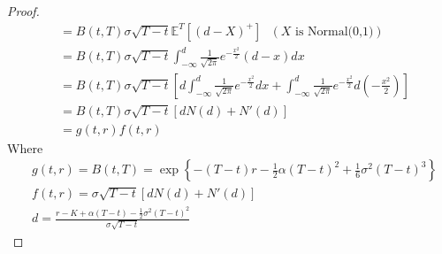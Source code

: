 \documentclass[a4paper, 10pt]{article}
\theoremstyle{definition}
\theoremstyle{hSol}
\begin{document}
\begin{proof}
\begin{equation}
\begin{split}
    &= B(t,T)\sigma \sqrt{T-t}\mathbb{E}^T\left[(d-X)^+\right]~~~(X\text{ is Normal(0,1)}) \\
    &= B(t,T)\sigma \sqrt{T-t} \int_{-\infty}^d \frac{1}{\sqrt{2\pi}}e^{-\frac{x^2}{2}}(d-x)dx \\
    &= B(t,T)\sigma \sqrt{T-t} \left[d\int_{-\infty}^d \frac{1}{\sqrt{2\pi}}e^{-\frac{x^2}{2}}dx + \int_{-\infty}^d \frac{1}{\sqrt{2\pi}}e^{-\frac{x^2}{2}} d\left(-\frac{x^2}{2}\right) \right]\\
    &= B(t,T)\sigma \sqrt{T-t} \left[dN(d) + N'(d) \right]\\
    &= g(t,r)f(t,r)
  \end{split}
\end{equation}
Where
\begin{equation}
  \begin{split}
    &g(t,r) = B(t,T) = \exp\left\{-(T-t)r - \frac{1}{2}\alpha(T-t)^2+\frac{1}{6}\sigma^2(T-t)^3\right\} \\
    &f(t,r) = \sigma \sqrt{T-t} \left[dN(d) + N'(d) \right]\\
    &d = \frac{r - K+ \alpha (T-t) - \frac{1}{2}\sigma^2(T-t)^2}{\sigma \sqrt{T-t}}
  \end{split}
\end{equation}
\end{proof}
\end{document}
